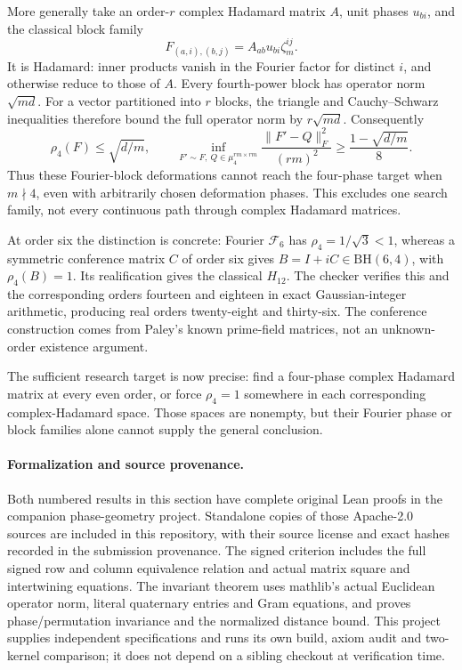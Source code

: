 More generally take an order-$r$ complex Hadamard matrix $A$,
unit phases $u_{bi}$, and the classical block family
\[
 F_{(a,i),(b,j)}=A_{ab}u_{bi}\zeta_m^{ij}.
\]
It is Hadamard: inner products vanish in the Fourier factor for
distinct $i$, and otherwise reduce to those of $A$.
Every fourth-power block has operator norm $\sqrt{md}$.
For a vector partitioned into $r$ blocks, the triangle and
Cauchy--Schwarz inequalities therefore bound the full operator norm
by $r\sqrt{md}$. Consequently
\[
 \rho_4(F)\le\sqrt{d/m},\qquad
 \inf_{F'\sim F,\ Q\in\mu_4^{rm\times rm}}
 \frac{\|F'-Q\|_F^2}{(rm)^2}
 \ge\frac{1-\sqrt{d/m}}8.
\]
Thus these Fourier-block deformations cannot reach the four-phase
target when $m\nmid4$, even with arbitrarily chosen deformation phases.
This excludes one search family, not every continuous path through
complex Hadamard matrices.

At order six the distinction is concrete: Fourier $\mathcal F_6$
has $\rho_4=1/\sqrt3<1$, whereas a symmetric conference matrix $C$
of order six gives $B=I+iC\in\mathrm{BH}(6,4)$, with $\rho_4(B)=1$.
Its realification gives the classical $H_{12}$. The checker verifies
this and the corresponding orders fourteen and eighteen in exact
Gaussian-integer arithmetic, producing real orders twenty-eight
and thirty-six. The conference construction comes from Paley's
known prime-field matrices, not an unknown-order existence argument.

The sufficient research target is now precise: find a four-phase
complex Hadamard matrix at every even order, or force $\rho_4=1$
somewhere in each corresponding complex-Hadamard space.
Those spaces are nonempty, but their Fourier phase or block
families alone cannot supply the general conclusion.

\paragraph{Formalization and source provenance.}
Both numbered results in this section have complete original Lean
proofs in the companion phase-geometry project. Standalone copies of
those Apache-2.0 sources are included in this repository, with their
source license and exact hashes recorded in the submission provenance.
The signed criterion includes the full signed row and column
equivalence relation and actual matrix square and intertwining
equations. The invariant theorem uses mathlib's actual Euclidean
operator norm, literal quaternary entries and Gram equations, and
proves phase/permutation invariance and the normalized distance bound.
This project supplies independent specifications and runs its own
build, axiom audit and two-kernel comparison; it does not depend on a
sibling checkout at verification time.
